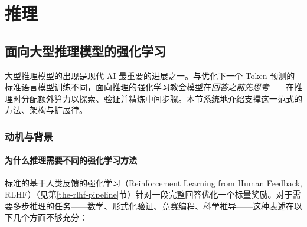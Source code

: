 \part{推理}

\chapter{面向大型推理模型的强化学习}
\label{sec:rl_reasoning}

大型推理模型的出现是现代 AI 最重要的进展之一。与优化下一个 Token 预测的标准语言模型训练不同，面向推理的强化学习教会模型在\emph{回答之前先思考}——在推理时分配额外算力以探索、验证并精炼中间步骤。本节系统地介绍支撑这一范式的方法、架构与扩展律。

\section{动机与背景}
\label{subsec:reasoning_motivation}

\subsection{为什么推理需要不同的强化学习方法}
\label{why-reasoning-requires-different-rl-approaches}

标准的基于人类反馈的强化学习（Reinforcement Learning from Human Feedback, RLHF）（见第\ref{the-rlhf-pipeline}节）针对一段完整回答优化一个标量奖励。对于需要多步推理的任务——数学、形式化验证、竞赛编程、科学推导——这种表述在以下几个方面不够充分：

